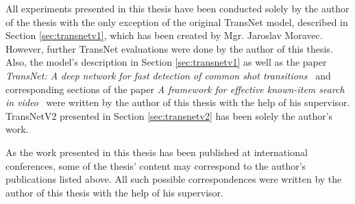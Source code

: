 All experiments presented in this thesis have been conducted solely by the author of the thesis with the only exception of the original TransNet model, described in Section \ref{sec:transnetv1}, which has been created by Mgr. Jaroslav Moravec. However, further TransNet evaluations were done by the author of this thesis. Also, the model's description in Section \ref{sec:transnetv1} as well as the paper \textit{TransNet: A deep network for fast detection of common shot transitions}~\cite{soucek2019transnet} and corresponding sections of the paper \textit{A framework for effective known-item search in video}~\cite{LokocMM2019} were written by the author of this thesis with the help of his supervisor. TransNetV2 presented in Section \ref{sec:transnetv2} has been solely the author's work.

As the work presented in this thesis has been published at international conferences, some of the thesis' content may correspond to the author's publications listed above. All such possible correspondences were written by the author of this thesis with the help of his supervisor.
